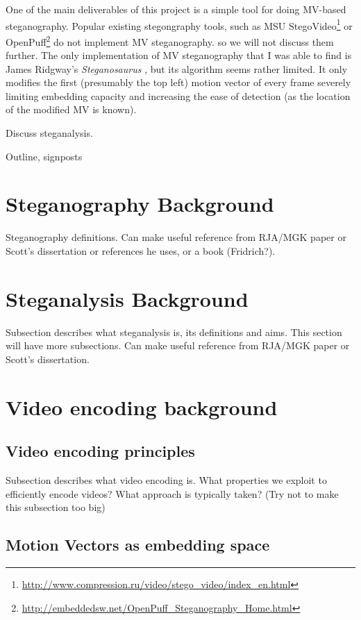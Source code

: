 \documentclass[12pt,british,twoside,notitlepage,usenames,dvipsnames,hypens,final]{report}
\numberwithin{equation}{section}
\numberwithin{figure}{section}
\begin{document}
One of the main deliverables of this project is a simple tool for doing MV-based steganography. Popular existing stegongraphy tools, such as MSU StegoVideo\footnote{\url{http://www.compression.ru/video/stego_video/index_en.html}} or OpenPuff\footnote{\url{http://embeddedsw.net/OpenPuff_Steganography_Home.html}} do not implement MV steganography. so we will not discuss them further. The only implementation of MV steganography that I was able to find is James Ridgway's \emph{Steganosaurus} \cite{steganosaurus}, but its algorithm seems rather limited. It only modifies the first (presumably the top left) motion vector of every frame severely limiting embedding capacity and increasing the ease of detection (as the location of the modified MV is known).   

Discuss steganalysis.


Outline, signposts

\section{Steganography Background}

Steganography definitions. Can make useful reference from RJA/MGK paper or Scott's dissertation or references he uses, or a book (Fridrich?). 

\section{Steganalysis Background}

Subsection describes what steganalysis is, its definitions and aims. This section will have more subsections. Can make useful reference from RJA/MGK paper or Scott's dissertation. 

\section{Video encoding background}

\subsection{Video encoding principles}

Subsection describes what video encoding is. What properties we exploit to efficiently encode videos? What approach is typically taken? (Try not to make this subsection too big)

\subsection{Motion Vectors as embedding space}
\end{document}
